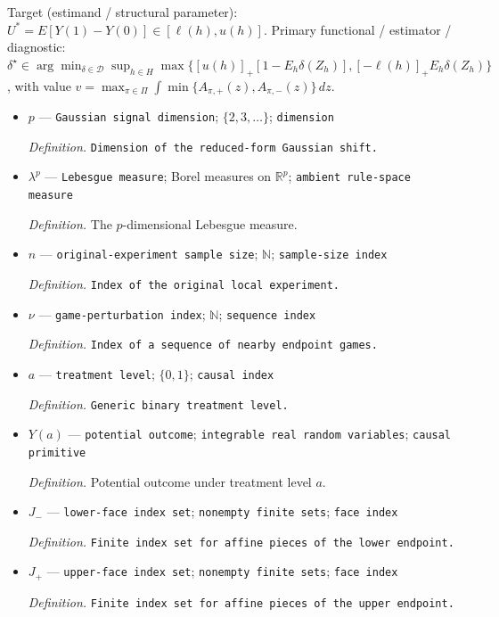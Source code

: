 \documentclass{article}
\begin{document}
Target (estimand / structural parameter): \(U^{\ast}=E[Y(1)-Y(0)]\in[\ell(h),u(h)]\).
Primary functional / estimator / diagnostic: \(\delta^{\star}\in\arg\min_{\delta\in\mathcal D}\sup_{h\in H}\max\{[u(h)]_{+}[1-E_h\delta(Z_h)],[-\ell(h)]_{+}E_h\delta(Z_h)\}\), with value \(v=\max_{\pi\in\Pi}\int\min\{A_{\pi,+}(z),A_{\pi,-}(z)\}\,dz\).
\begin{itemize}
  \item \(p\) --- \texttt{Gaussian signal dimension}; \(\{2,3,\ldots\}\); \texttt{dimension}
  \par\smallskip\noindent\emph{Definition.} \texttt{Dimension of the reduced-\allowbreak{}form Gaussian shift.}
  \item \(\lambda^p\) --- \texttt{Lebesgue measure}; Borel measures on \(\mathbb R^p\); \texttt{ambient rule-\allowbreak{}space measure}
  \par\smallskip\noindent\emph{Definition.} The \(p\)-dimensional Lebesgue measure.
  \item \(n\) --- \texttt{original-\allowbreak{}experiment sample size}; \(\mathbb N\); \texttt{sample-\allowbreak{}size index}
  \par\smallskip\noindent\emph{Definition.} \texttt{Index of the original local experiment.}
  \item \(\nu\) --- \texttt{game-\allowbreak{}perturbation index}; \(\mathbb N\); \texttt{sequence index}
  \par\smallskip\noindent\emph{Definition.} \texttt{Index of a sequence of nearby endpoint games.}
  \item \(a\) --- \texttt{treatment level}; \(\{0,1\}\); \texttt{causal index}
  \par\smallskip\noindent\emph{Definition.} \texttt{Generic binary treatment level.}
  \item \(Y(a)\) --- \texttt{potential outcome}; \texttt{integrable real random variables}; \texttt{causal primitive}
  \par\smallskip\noindent\emph{Definition.} Potential outcome under treatment level \(a\).
  \item \(J_{-}\) --- \texttt{lower-\allowbreak{}face index set}; \texttt{nonempty finite sets}; \texttt{face index}
  \par\smallskip\noindent\emph{Definition.} \texttt{Finite index set for affine pieces of the lower endpoint.}
  \item \(J_{+}\) --- \texttt{upper-\allowbreak{}face index set}; \texttt{nonempty finite sets}; \texttt{face index}
  \par\smallskip\noindent\emph{Definition.} \texttt{Finite index set for affine pieces of the upper endpoint.}

\end{itemize}
\end{document}
